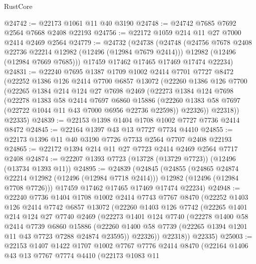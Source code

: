 \begin{lexlean}{RustCore}
\begin{coremodule}
@24742 := @22173 @1061 @11 @40 @3190
@24748 := @24742 @7685 @7692 @2564 @7668 @2408 @22193
@24756 := @22172 @1059 @214 @11 @27 @7000 @2414 @2469 @2564
@24779 := @24732
    (@24738
      (@24748
        (@24756 @7678 @2408 @22736 @22214 @12982 (@12496 (@12984 @7679 @2414)))
        @12982
        (@12496 (@12984 @7669 @7685)))
      @17459
      @17462
      @17465
      @17469
      @17474
      @22234)
@24831 := @22240
    @7695
    @1387
    @1709
    @1002
    @2414
    @7701
    @7727
    @8472
    (@22252
      @1386
      @126
      @2414
      @7700
      @6857
      @13072
      (@22260
        @1386
        @126
        @7700
        (@22265
          @1384
          @214
          @124
          @27
          @7698
          @2469
          (@22273
            @1384
            @124
            @7698
            (@22278
              @1383
              @58
              @2414
              @7697
              @6860
              @15886
              (@22260 @1383 @58 @7697 (@22722 @1044 @11 @43 @7000 @6956 @22736 @22598))
              @22326))
          @22318))
      @22335)
@24839 := @22153 @1398 @1404 @1708 @1002 @7727 @7736 @2414 @8472
@24845 := @22164 @1397 @43 @13 @7727 @7734 @4410
@24855 := @22173 @1396 @11 @40 @3190 @7726 @7733 @2564 @7707 @2408 @22193
@24865 := @22172 @1394 @214 @11 @27 @7723 @2414 @2469 @2564 @7717 @2408
@24874 := @22207 @1393 @7723 (@13728 (@13729 @7723)) (@12496 (@13734 @1393 @11))
@24895 := @24839
    (@24845
      (@24855
        (@24865 @24874 @22214 @12982 (@12496 (@12984 @7718 @2414)))
        @12982
        (@12496 (@12984 @7708 @7726)))
      @17459
      @17462
      @17465
      @17469
      @17474
      @22234)
@24948 := @22240
    @7736
    @1404
    @1708
    @1002
    @2414
    @7743
    @7767
    @8470
    (@22252
      @1403
      @126
      @2414
      @7742
      @6857
      @13072
      (@22260
        @1403
        @126
        @7742
        (@22265
          @1401
          @214
          @124
          @27
          @7740
          @2469
          (@22273
            @1401
            @124
            @7740
            (@22278
              @1400
              @58
              @2414
              @7739
              @6860
              @15886
              (@22260 @1400 @58 @7739 (@22265 @1394 @1201 @11 @43 @7723 @7288 @24874 @23595))
              @22326))
          @22318))
      @22335)
@25003 := @22153
    @1407
    @1422
    @1707
    @1002
    @7767
    @7776
    @2414
    @8470
    (@22164
      @1406
      @43
      @13
      @7767
      @7774
      @4410
      (@22173
        @1083
        @11

\end{coremodule}
\end{lexlean}
